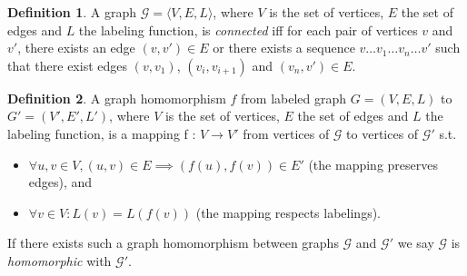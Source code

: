 \documentclass{article}
\theoremstyle{definition}
\newtheorem{definition}{Definition}[section]
\newcommand{\triple}[1]{\ensuremath{\langle #1 \rangle}}
\newcommand{\pair}[1]{\ensuremath{\left(#1\right)}}
\newcommand{\graph}[1]{\ensuremath{\mathcal{#1}}}
\begin{document}
\begin{definition}
A graph $\graph{G} = \triple{V,E,L}$, where $V$ is the set of vertices, $E$ the set of edges and $L$ the labeling function, is \emph{connected} iff for each pair of vertices $v$ and $v'$, there exists an edge $\pair{v,v'} \in E$ or there exists a sequence $v \ldots v_{1} \ldots v_{n} \ldots v'$ such that there exist edges $\pair{v,v_{1}}$, $\pair{v_{i},v_{i+1}}$ and $\pair{v_{n},v'} \in E$.
\end{definition}


\begin{definition}
A graph homomorphism $f$ from labeled graph $G = (V,E,L)$ to $G' = (V',E',L')$, where $V$ is the set of vertices, $E$ the set of edges and $L$ the labeling function, is a mapping f : $V \rightarrow V'$ from vertices of $\graph{G}$ to vertices of $\graph{G'}$ s.t. 
\begin{itemize}
\item $\forall u,v \in V, \pair{u,v} \in E \implies \pair{f(u),f(v)} \in E'$ (the mapping preserves edges), and 
\item $\forall v \in V : L(v) = L(f(v))$ (the mapping respects labelings).
\end{itemize}
If there exists such a graph homomorphism between graphs $\graph{G}$ and $\graph{G'}$ we say $\graph{G}$ is \emph{homomorphic} with $\graph{G'}$.
\end{definition}
\end{document}
